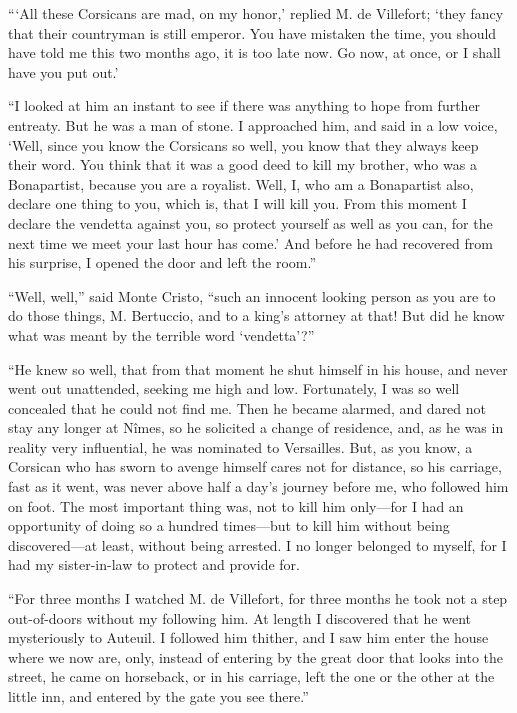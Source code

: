 “‘All these Corsicans are mad, on my honor,’ replied M. de Villefort;
‘they fancy that their countryman is still emperor. You have mistaken
the time, you should have told me this two months ago, it is too late
now. Go now, at once, or I shall have you put out.’

“I looked at him an instant to see if there was anything to hope from
further entreaty. But he was a man of stone. I approached him, and said
in a low voice, ‘Well, since you know the Corsicans so well, you know
that they always keep their word. You think that it was a good deed to
kill my brother, who was a Bonapartist, because you are a royalist.
Well, I, who am a Bonapartist also, declare one thing to you, which is,
that I will kill you. From this moment I declare the vendetta against
you, so protect yourself as well as you can, for the next time we meet
your last hour has come.’ And before he had recovered from his
surprise, I opened the door and left the room.”

“Well, well,” said Monte Cristo, “such an innocent looking person as
you are to do those things, M. Bertuccio, and to a king’s attorney at
that! But did he know what was meant by the terrible word ‘vendetta’?”

“He knew so well, that from that moment he shut himself in his house,
and never went out unattended, seeking me high and low. Fortunately, I
was so well concealed that he could not find me. Then he became
alarmed, and dared not stay any longer at Nîmes, so he solicited a
change of residence, and, as he was in reality very influential, he was
nominated to Versailles. But, as you know, a Corsican who has sworn to
avenge himself cares not for distance, so his carriage, fast as it
went, was never above half a day’s journey before me, who followed him
on foot. The most important thing was, not to kill him only—for I had
an opportunity of doing so a hundred times—but to kill him without
being discovered—at least, without being arrested. I no longer belonged
to myself, for I had my sister-in-law to protect and provide for.

“For three months I watched M. de Villefort, for three months he took
not a step out-of-doors without my following him. At length I
discovered that he went mysteriously to Auteuil. I followed him
thither, and I saw him enter the house where we now are, only, instead
of entering by the great door that looks into the street, he came on
horseback, or in his carriage, left the one or the other at the little
inn, and entered by the gate you see there.”


